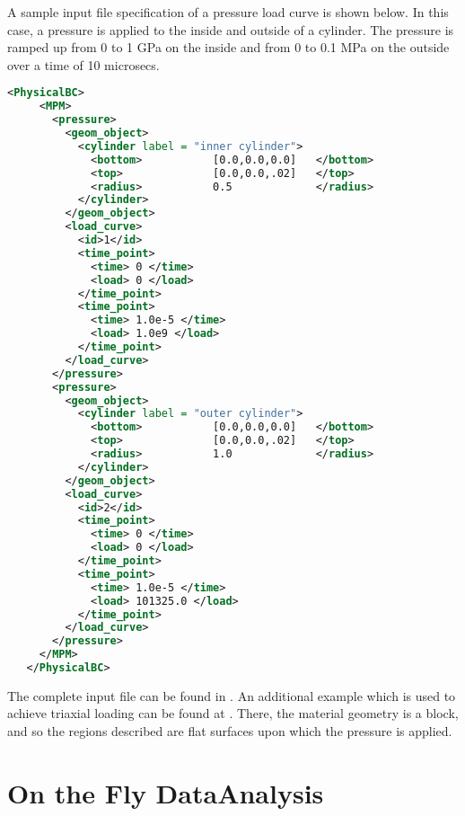 A sample input file specification of a pressure load curve is shown below.
In this case, a pressure is applied to the inside and outside of a cylinder.
The pressure is ramped up from 0 to 1 GPa on the inside and from 0 to 0.1 MPa
on the outside over a time of 10 microsecs.
\begin{lstlisting}[language=XML]
   <PhysicalBC>
     <MPM>
       <pressure>
         <geom_object>
           <cylinder label = "inner cylinder">
             <bottom>           [0.0,0.0,0.0]   </bottom>
             <top>              [0.0,0.0,.02]   </top>
             <radius>           0.5             </radius>
           </cylinder>
         </geom_object>
         <load_curve>
           <id>1</id>
           <time_point>
             <time> 0 </time>
             <load> 0 </load>
           </time_point>
           <time_point>
             <time> 1.0e-5 </time>
             <load> 1.0e9 </load>
           </time_point>
         </load_curve>
       </pressure>
       <pressure>
         <geom_object>
           <cylinder label = "outer cylinder">
             <bottom>           [0.0,0.0,0.0]   </bottom>
             <top>              [0.0,0.0,.02]   </top>
             <radius>           1.0             </radius>
           </cylinder>
         </geom_object>
         <load_curve>
           <id>2</id>
           <time_point>
             <time> 0 </time>
             <load> 0 </load>
           </time_point>
           <time_point>
             <time> 1.0e-5 </time>
             <load> 101325.0 </load>
           </time_point>
         </load_curve>
       </pressure>
     </MPM>
   </PhysicalBC>
\end{lstlisting}
The complete input file can be found in . 
An additional example which is used to achieve triaxial loading can be found
at .  There, the material geometry is a block, and so
the regions described are flat surfaces upon which the pressure is applied.

\section{On the Fly DataAnalysis} \label{Sec:OTFA_MPM}

